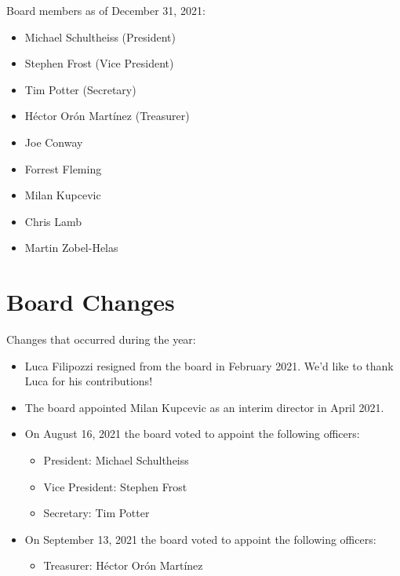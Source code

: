 \documentclass[a4paper]{report}
\begin{document}
Board members as of December 31, 2021:

\begin{itemize}
\item Michael Schultheiss (President)
\item Stephen Frost (Vice President)
\item Tim Potter (Secretary)
\item Héctor Orón Martínez (Treasurer)
\item Joe Conway
\item Forrest Fleming
\item Milan Kupcevic
\item Chris Lamb
\item Martin Zobel-Helas
\end{itemize}

\section{Board Changes}

Changes that occurred during the year:

\begin{itemize}

\item Luca Filipozzi resigned from the board in February 2021.  We'd like to thank Luca for his contributions!

\item The board appointed Milan Kupcevic as an interim director in April 2021.

\item On August 16, 2021 the board voted to appoint the following officers:

\begin{itemize}
\item President: Michael Schultheiss
\item Vice President: Stephen Frost
\item Secretary: Tim Potter
\end{itemize}

\item On September 13, 2021 the board voted to appoint the following officers:

\begin{itemize}
\item Treasurer: Héctor Orón Martínez
\end{itemize}

\end{itemize}
\end{document}
